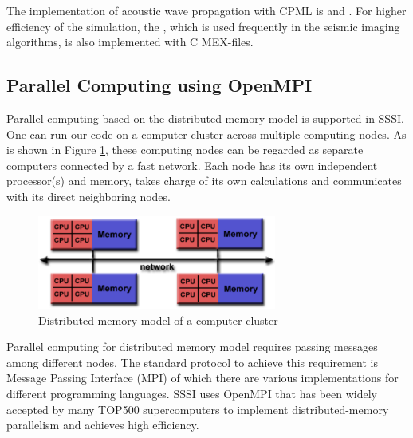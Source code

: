 \documentclass[11pt]{article}
\theoremstyle{plain}
\theoremstyle{definition}
\theoremstyle{remark}
\numberwithin{equation}{section}
\begin{document}
The implementation of acoustic wave propagation with CPML is  and .
For higher efficiency of the simulation, the , which is used frequently in the seismic imaging algorithms, is also implemented with C MEX-files. 


\subsection{Parallel Computing using OpenMPI}
Parallel computing based on the distributed memory model is supported in SSSI. One can run our code on a computer cluster across multiple computing nodes. As is shown in Figure \ref{fig:distrMemModel}, these computing nodes can be regarded as separate computers connected by a fast network. Each node has its own independent processor(s) and memory, takes charge of its own calculations and communicates with its direct neighboring nodes.
\begin{figure}[htbp]
\centering
\includegraphics[width=0.7\textwidth]{Fig/MPI_MultipleCPU.pdf}
\caption{Distributed memory model of a computer cluster}
\label{fig:distrMemModel}
\end{figure}

Parallel computing for distributed memory model requires passing messages among different nodes. The standard protocol to achieve this requirement is Message Passing Interface (MPI) of which there are various implementations for different programming languages. SSSI uses OpenMPI\cite{Gabriel:2004aa} that has been widely accepted by many TOP500 supercomputers to implement distributed-memory parallelism and achieves high efficiency.
\end{document}
